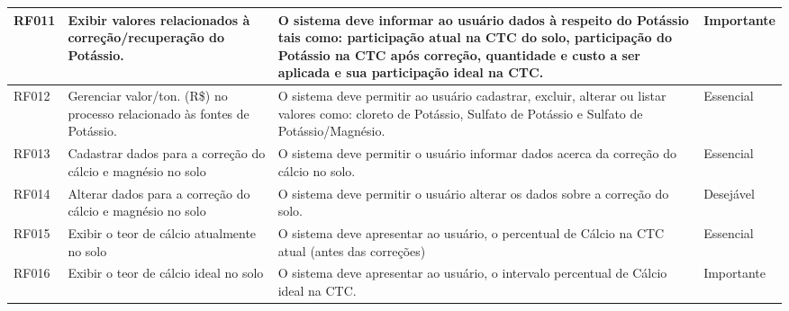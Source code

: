 \begin{landscape}
\begin{longtable}{|p{1.5cm}|p{5cm}|p{9cm}|p{2.5cm}|}
    RF011 & Exibir valores relacionados à correção/recuperação do Potássio.                  & O sistema deve informar ao usuário dados à respeito do Potássio tais como: participação atual na CTC do solo,  participação do Potássio na CTC após correção, quantidade e custo a ser aplicada e sua participação ideal na CTC.                                                                        & Importante \\\hline
    RF012 & Gerenciar valor/ton. (R\$) no processo relacionado às fontes de Potássio.        & O sistema deve permitir ao usuário cadastrar, excluir, alterar ou listar valores como: cloreto de Potássio, Sulfato de Potássio e Sulfato de Potássio/Magnésio.                                                                                                                                         & Essencial  \\\hline
    RF013 & Cadastrar dados para a correção do cálcio e magnésio no solo                     & O sistema deve permitir o usuário informar dados acerca da correção do cálcio no solo.                                                                                                                                                                                                                  & Essencial \\\hline
    RF014 & Alterar dados para a correção do cálcio e magnésio no solo                       & O sistema deve permitir o usuário alterar os dados sobre a correção do solo.                                                                                                                                                                                                                            & Desejável  \\\hline
    RF015 & Exibir o teor de cálcio atualmente no solo                                       & O sistema deve apresentar ao usuário, o percentual de Cálcio na CTC atual (antes das correções)                                                                                                                                                                                                         & Essencial  \\\hline
    RF016 & Exibir o teor de cálcio ideal no solo                                            & O sistema deve apresentar ao usuário, o intervalo percentual de Cálcio ideal na CTC.                                                                                                                                                                                                                    & Importante  \\\hline

\end{longtable}
\end{landscape}
